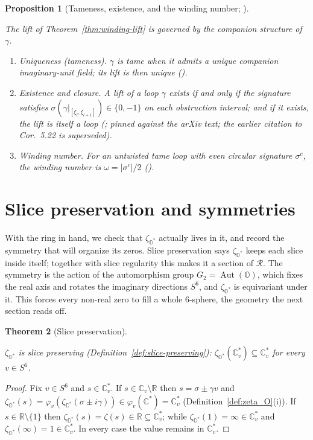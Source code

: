 \documentclass[11pt]{article}
\newcommand{\OO}{\mathbb{O}}
\newcommand{\CC}{\mathbb{C}}
\newcommand{\RR}{\mathbb{R}}
\newcommand{\Ostar}{\OO^{*}}
\newcommand{\Cstar}{\CC^{*}}
\newcommand{\zetaO}{\zeta_{\Ostar}}
\newcommand{\zetaC}{\zeta_{\Cstar}}
\DeclareMathOperator{\Aut}{Aut}
\providecommand{\Gtwo}{G_2}
\providecommand{\lean}[1]{}
\providecommand{\uses}[1]{}
\theoremstyle{plain}
\newtheorem{theorem}{Theorem}[section]
\newtheorem{proposition}[theorem]{Proposition}
\theoremstyle{definition}
\theoremstyle{remark}
\begin{document}
\begin{proposition}[Tameness, existence, and the winding number; ]\label{prop:winding-signature}
\lean{winding_lift_unique, winding_loop_defect}
\uses{thm:winding-lift}
The lift of Theorem~\ref{thm:winding-lift} is governed by the companion structure of $\gamma$.
\begin{enumerate}[label=\textup{(\roman*)},leftmargin=2.6em]
\item \emph{Uniqueness (tameness).} $\gamma$ is \emph{tame} when it admits a \emph{unique} companion
  imaginary-unit field; its lift is then unique \textup{(}\cite[Def.~4.20]{GPVwind}\textup{)}.
\item \emph{Existence and closure.} A lift of a loop $\gamma$ exists if and only if the signature
  satisfies $\sigma(\gamma|_{[\xi_l,\xi_{l+1}]})\in\{0,-1\}$ on each obstruction interval; and
  \emph{if it exists, the lift is itself a loop} \textup{(}\cite[Cor.~5.13]{GPVwind}; pinned
  against the arXiv text; the earlier citation to Cor.~5.22 is superseded\textup{)}.
\item \emph{Winding number.} For an untwisted tame loop with even circular signature $\sigma^c$, the
  winding number is $\omega=|\sigma^c|/2$ \textup{(}\cite[Cor.~5.21]{GPVwind}\textup{)}.
\end{enumerate}
\end{proposition}

\section{Slice preservation and symmetries}

With the ring in hand, we check that $\zetaO$ actually lives in it, and record the symmetry that will
organize its zeros. Slice preservation says $\zetaO$ keeps each slice inside itself; together with
slice regularity this makes it a section of $\mathcal R$. The symmetry is the action of the
automorphism group $\Gtwo=\Aut(\OO)$, which fixes the real axis and rotates the imaginary directions
$S^6$, and $\zetaO$ is equivariant under it. This forces every non-real zero to fill a whole
$6$-sphere, the geometry the next section reads off.

\begin{theorem}[Slice preservation]\label{thm:slice-pres}
\lean{zetaO_mem_sliceSphere}
\uses{def:zeta_O, def:slice-preserving}
$\zetaO$ is slice preserving (Definition~\ref{def:slice-preserving}):
$\zetaO(\CC_v^{*})\subseteq\CC_v^{*}$ for every $v\in S^6$.
\end{theorem}
\begin{proof}
Fix $v\in S^6$ and $s\in\CC_v^{*}$. If $s\in\CC_v\setminus\RR$ then $s=\sigma\pm\gamma v$
and $\zetaO(s)=\varphi_v(\zetaC(\sigma\pm i\gamma))\in\varphi_v(\Cstar)=\CC_v^{*}$
(Definition~\ref{def:zeta_O}(i)). If $s\in\RR\setminus\{1\}$ then
$\zetaO(s)=\zeta(s)\in\RR\subseteq\CC_v^{*}$; while $\zetaO(1)=\infty\in\CC_v^{*}$ and
$\zetaO(\infty)=1\in\CC_v^{*}$. In every case the value remains in $\CC_v^{*}$.
\end{proof}
\end{document}
